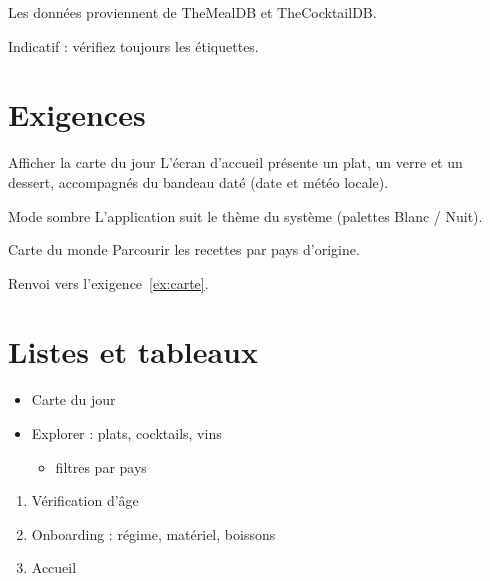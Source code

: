 \documentclass[a4paper,10pt]{report}
\begin{document}
\begin{note}
  Les données proviennent de TheMealDB et TheCocktailDB.
\end{note}

\begin{attention}[Allergènes]
  Indicatif : vérifiez toujours les étiquettes.
\end{attention}

\section{Exigences}

\begin{exigence}[priorite=haute]{Afficher la carte du jour}
  \label{ex:carte}
  L'écran d'accueil présente un plat, un verre et un dessert, accompagnés
  du bandeau daté (date et météo locale).
\end{exigence}

\begin{exigence}[type=ENF, priorite=moyenne]{Mode sombre}
  L'application suit le thème du système (palettes Blanc / Nuit).
\end{exigence}

\begin{exigence}[priorite=basse]{Carte du monde}
  Parcourir les recettes par pays d'origine.
\end{exigence}

Renvoi vers l'exigence~\ref{ex:carte}.

\section{Listes et tableaux}

\begin{itemize}
  \item Carte du jour
  \item Explorer : plats, cocktails, vins
  \begin{itemize}
    \item filtres par pays
  \end{itemize}
\end{itemize}

\begin{enumerate}
  \item Vérification d'âge
  \item Onboarding : régime, matériel, boissons
  \item Accueil
\end{enumerate}
\end{document}
